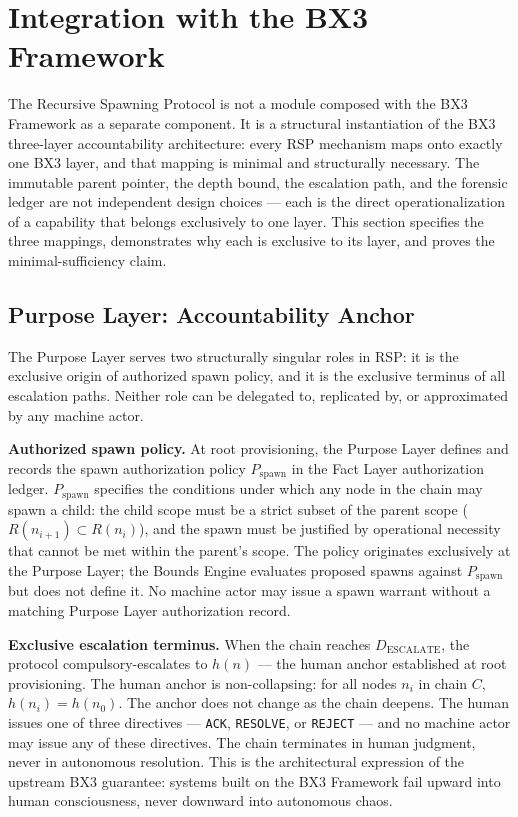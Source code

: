 \section{Integration with the BX3 Framework}
\label{sec:rs-integration}

The Recursive Spawning Protocol is not a module composed with the BX3 Framework as a separate component. It is a structural instantiation of the BX3 three-layer accountability architecture: every RSP mechanism maps onto exactly one BX3 layer, and that mapping is minimal and structurally necessary. The immutable parent pointer, the depth bound, the escalation path, and the forensic ledger are not independent design choices — each is the direct operationalization of a capability that belongs exclusively to one layer. This section specifies the three mappings, demonstrates why each is exclusive to its layer, and proves the minimal-sufficiency claim.

\subsection{Purpose Layer: Accountability Anchor}
\label{sec:rs-purpose-anchor}

The Purpose Layer serves two structurally singular roles in RSP: it is the exclusive origin of authorized spawn policy, and it is the exclusive terminus of all escalation paths. Neither role can be delegated to, replicated by, or approximated by any machine actor.

\medskip
\noindent\textbf{Authorized spawn policy.} At root provisioning, the Purpose Layer defines and records the spawn authorization policy $P_{\text{spawn}}$ in the Fact Layer authorization ledger. $P_{\text{spawn}}$ specifies the conditions under which any node in the chain may spawn a child: the child scope must be a strict subset of the parent scope ($R(n_{i+1}) \subset R(n_i)$), and the spawn must be justified by operational necessity that cannot be met within the parent's scope. The policy originates exclusively at the Purpose Layer; the Bounds Engine evaluates proposed spawns against $P_{\text{spawn}}$ but does not define it. No machine actor may issue a spawn warrant without a matching Purpose Layer authorization record.

\medskip
\noindent\textbf{Exclusive escalation terminus.} When the chain reaches $D_{\text{ESCALATE}}$, the protocol compulsory-escalates to $h(n)$ — the human anchor established at root provisioning. The human anchor is non-collapsing: for all nodes $n_i$ in chain $C$, $h(n_i) = h(n_0)$. The anchor does not change as the chain deepens. The human issues one of three directives — \texttt{ACK}, \texttt{RESOLVE}, or \texttt{REJECT} — and no machine actor may issue any of these directives. The chain terminates in human judgment, never in autonomous resolution. This is the architectural expression of the upstream BX3 guarantee: systems built on the BX3 Framework fail upward into human consciousness, never downward into autonomous chaos.

